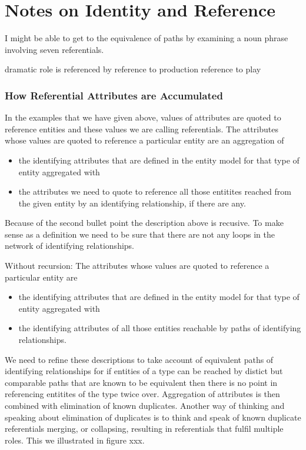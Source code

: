 \section{Notes on Identity and Reference}

\begin{noteforfuture}
I might be able to get to the equivalence of paths by examining
a noun phrase involving seven referentials.

dramatic role is referenced by reference to production reference to play
\end{noteforfuture}

 

 \subsubsection {How Referential Attributes are Accumulated}
 \mynote
 In the examples that we have given above, values of attributes are quoted to reference entities and these values we are calling referentials.  
\mynote
The attributes whose values are quoted to reference a particular entity are
an aggregation of
\begin{itemize}
\item the
identifying attributes that are defined in the entity model for that type of entity aggregated with 
\item
the attributes we need to quote to reference all those entitites reached from the given entity by an identifying relationship, if there are any.
\end{itemize}





\mynote
Because of the second bullet point the description above is recusive. 
To make sense as a definition 
we need to be sure that there are not any loops in the network of identifying relationships.  

\mynote
Without recursion: 
The attributes whose values are quoted to reference a particular entity are 
\begin{itemize}
\item the identifying attributes that are defined in the entity model 
for that type of entity
aggregated with 
\item the identifying attributes of all those entities reachable by paths of identifying relationships.
\end{itemize}  

\mynote 
We need to refine these descriptions to take account of 
equivalent paths of identifying relationships for if
entities of a type can be reached by distict but comparable paths that are known to be equivalent then there is no point in 
referencing entitites of the type twice over. 
Aggregation of attributes is then combined with elimination of known duplicates.
Another way of thinking and speaking about elimination of duplicates is to think and speak of known duplicate referentials 
merging, or collapsing, resulting in referentials that fulfil multiple roles. This we illustrated in figure xxx. 


